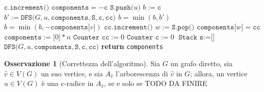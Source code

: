 \documentclass[14pt]{extreport}
\theoremstyle{definition}
\theoremstyle{definition}
\newtheorem{remark}{Osservazione}[subsection]
\begin{document}
\begin{algorithm}[H]
    \caption{
        Dato un grafo diretto $G$, rappresentato attraverso liste di adiacenza, l'algoritmo restituisce le componenti di $G$.\\
        \textbf{Input}: $G$ grafo diretto, rappresentato attraverso liste di adiacenza.\\
        \textbf{Output}: le componenti di $G$.
    }

    \begin{algorithmic}[1]
            \State $\texttt{c.increment()}$
            \State $\texttt{components} = - \texttt{c}$ 
            \State $\texttt{S.push(}u\texttt{)}$
            \State $b := \texttt{c}$
                    \State $b' := \texttt{DFS(}G, u, \texttt{components}, \texttt{S}, \texttt{c}, \texttt{cc)}$
                    \State $b = \min(b, b')$
                    \State $b = \min(b, - \texttt{components[}v\texttt{]})$
                \EndIf
            \EndFor
             
                \State $\texttt{cc.increment()}$
                \Do
                    \State $w := \texttt{S.pop()}$
                    \State $\texttt{components[}w\texttt{]} = \texttt{cc}$
            \EndIf
        \EndFunction
        \\
            \State $\texttt{components} := \texttt{[}0\texttt{]} * n$
            \State $\texttt{Counter cc} := 0$
            \State $\texttt{Counter c} := 0$
            \State $\texttt{Stack s} := \texttt{[}\texttt{]}$
                    \State $\texttt{DFS(}G, u, \texttt{components}, \texttt{S}, \texttt{c}, \texttt{cc)}$
                \EndIf
            \EndFor
            \State \textbf{return} \texttt{components}
        \EndFunction
    \end{algorithmic}
\end{algorithm}

\begin{remark}[Correttezza dell'algoritmo]
    Sia $G$ un grafo diretto, sia $\hat v \in V(G)$ un suo vertice, e sia $A_{\hat v}$ l'arborescenza di $\hat v$ in $G$; allora, un vertice $u \in V(G)$ è una c-radice in $A_{\hat v}$, se e solo se TODO DA FINIRE
\end{remark}
\end{document}
